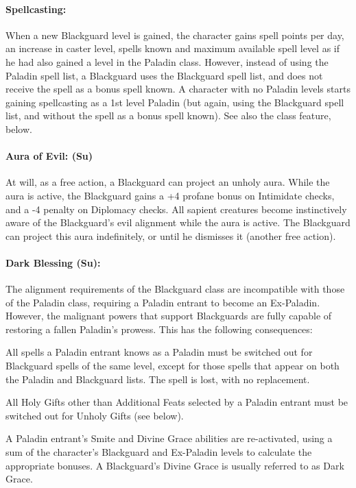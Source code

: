 \paragraph{Spellcasting:} When a new Blackguard level is gained, the character gains spell points per day, an increase in caster level, spells known and maximum available spell level as if he had also gained a level in the Paladin class. However, instead of using the Paladin spell list, a Blackguard uses the Blackguard spell list, and does not receive the  spell as a bonus spell known. A character with no Paladin levels starts gaining spellcasting as a 1st level Paladin (but again, using the Blackguard spell list, and without the  spell as a bonus spell known). See also the  class feature, below.

\paragraph[Aura of Evil]{Aura of Evil: (Su)}
\label{sec:AuroOfEvil} 
At will, as a free action, a Blackguard can project an unholy aura.
While the aura is active, the Blackguard gains a +4 profane bonus on Intimidate checks, and a -4 penalty on Diplomacy checks.
All sapient creatures become instinctively aware of the Blackguard's evil alignment while the aura is active.
The Blackguard can project this aura indefinitely, or until he dismisses it (another free action). 

\paragraph[Dark Blessing]{Dark Blessing (Su):} 
\label{sec:DarkBlessing}
The alignment requirements of the Blackguard class are incompatible with those of the Paladin class, requiring a Paladin entrant to become an Ex-Paladin. However, the malignant powers that support Blackguards are fully capable of restoring a fallen Paladin's prowess. This has the following consequences:
\begin{list}{}{\leftmargin=1em}
 \item All spells a Paladin entrant knows as a Paladin must be switched out for Blackguard spells of the same level, except for those spells that appear on both the Paladin and Blackguard lists. The  spell is lost, with no replacement.
 \item All Holy Gifts other than Additional Feats selected by a Paladin entrant must be switched out for Unholy Gifts (see below).
 \item A Paladin entrant's Smite and Divine Grace abilities are re-activated, using a sum of the character's Blackguard and Ex-Paladin levels to calculate the appropriate bonuses. A Blackguard's Divine Grace is usually referred to as Dark Grace.
\end{list}

